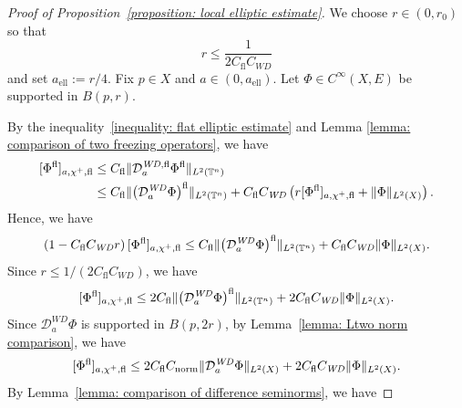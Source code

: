 \documentclass[a4paper,oneside,12pt]{amsart}
\theoremstyle{plain}
\theoremstyle{definition}
\theoremstyle{remark}
\DeclarePairedDelimiter{\norm}{\lVert}{\rVert}
\DeclarePairedDelimiter{\seminorm}{\lbrack}{\rbrack}
\newcommand{\flattorus}{\mathbb{T}^n}
\newcommand{\Ltwonorm}[2][L^2]{\norm{#2}_{#1}}
\newcommand{\flatmesoscopicdifferenceseminorm}[3][a]{\seminorm{#3}_{#1,#2,\mathrm{fl}}}
\newcommand{\mesoscopicWilsonDiracoperator}[1][a]{\mathcal{D}_{#1}^{\mathit{WD}}}
\newcommand{\cutoffupper}{\chi^+}
\newcommand{\flatmesoscopicWilsonDiracoperator}[1][a]{\mathcal{D}_{#1}^{\mathit{WD},\mathrm{fl}}}
\newcommand{\flatmodel}[1]{#1^{\mathrm{fl}}}
\newcommand{\constantflat}{C_{\mathrm{fl}}}
\newcommand{\constantLtwonorm}{C_{\mathrm{norm}}}
\newcommand{\constantWD}{C_{\mathit{WD}}}
\newcommand{\constantAell}{a_{\mathrm{ell}}}
\begin{document}
\begin{proof}[Proof of Proposition~\ref{proposition: local elliptic estimate}]
  We choose $r \in (0,r_0)$ so that
  \begin{equation}
    r \le \frac{1}{2 \constantflat \constantWD}
  \end{equation}
  and set $\constantAell := r/4$.
  Fix $p \in X$ and $a \in (0,\constantAell)$.
  Let $\Phi \in C^{\infty}(X,E)$ be supported in $B(p,r)$.

  By the inequality~\eqref{inequality: flat elliptic estimate} and Lemma \ref{lemma: comparison of two freezing operators}, we have
  \begin{equation}
    \begin{aligned}
    \flatmesoscopicdifferenceseminorm{\cutoffupper}{\flatmodel{\Phi}} \le{}& \constantflat \Ltwonorm[L^2(\flattorus)]{\flatmesoscopicWilsonDiracoperator \flatmodel{\Phi}} \\
    \le{}& \constantflat \Ltwonorm[L^2(\flattorus)]{\flatmodel{\big(\mesoscopicWilsonDiracoperator \Phi\big)}} + \constantflat \constantWD \left( r \flatmesoscopicdifferenceseminorm{\cutoffupper}{\flatmodel{\Phi}} + \Ltwonorm[L^2(X)]{\Phi} \right).
    \end{aligned}
  \end{equation}
  Hence, we have
  \begin{equation}
    \left(1 - \constantflat \constantWD r\right) \flatmesoscopicdifferenceseminorm{\cutoffupper}{\flatmodel{\Phi}} \le \constantflat \Ltwonorm[L^2(\flattorus)]{\flatmodel{\big(\mesoscopicWilsonDiracoperator \Phi\big)}} + \constantflat \constantWD  \Ltwonorm[L^2(X)]{\Phi}.
  \end{equation}
  Since $r \le 1 / (2 \constantflat \constantWD)$, we have
  \begin{equation}
    \flatmesoscopicdifferenceseminorm{\cutoffupper}{\flatmodel{\Phi}} \le 2\constantflat \Ltwonorm[L^2(\flattorus)]{\flatmodel{\big(\mesoscopicWilsonDiracoperator \Phi\big)}} + 2\constantflat \constantWD  \Ltwonorm[L^2(X)]{\Phi}.
  \end{equation}
  Since $\mesoscopicWilsonDiracoperator \Phi$ is supported in $B(p,2r)$, by Lemma~\ref{lemma: Ltwo norm comparison}, we have
  \begin{equation}
    \flatmesoscopicdifferenceseminorm{\cutoffupper}{\flatmodel{\Phi}} \le 2 \constantflat \constantLtwonorm \Ltwonorm[L^2(X)]{\mesoscopicWilsonDiracoperator \Phi} + 2\constantflat \constantWD \Ltwonorm[L^2(X)]{\Phi}.
  \end{equation}
  By Lemma~\ref{lemma: comparison of difference seminorms}, we have

\end{proof}
\end{document}
